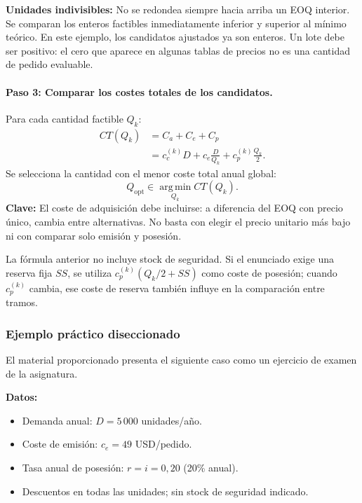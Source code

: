 \documentclass[11pt,a4paper]{article}
\begin{document}
\textbf{Unidades indivisibles:} No se redondea siempre hacia arriba un EOQ interior. Se comparan los enteros factibles inmediatamente inferior y superior al mínimo teórico. En este ejemplo, los candidatos ajustados ya son enteros. Un lote debe ser positivo: el cero que aparece en algunas tablas de precios no es una cantidad de pedido evaluable.

\paragraph{Paso 3: Comparar los costes totales de los candidatos.}
Para cada cantidad factible $Q_k$:
\begin{align*}
    CT(Q_k)
     & =C_a+C_e+C_p \\
     & =c_c^{(k)}D
    +c_e\frac{D}{Q_k}
    +c_p^{(k)}\frac{Q_k}{2}.
\end{align*}
Se selecciona la cantidad con el menor coste total anual global:
\[
    Q_{\mathrm{opt}}\in\operatorname*{arg\,min}_{Q_k}CT(Q_k).
\]
\textbf{Clave:} El coste de adquisición debe incluirse: a diferencia del EOQ con precio único, cambia entre alternativas. No basta con elegir el precio unitario más bajo ni con comparar solo emisión y posesión.

La fórmula anterior no incluye stock de seguridad. Si el enunciado exige una reserva fija $SS$, se utiliza $c_p^{(k)}(Q_k/2+SS)$ como coste de posesión; cuando $c_p^{(k)}$ cambia, ese coste de reserva también influye en la comparación entre tramos.

\subsubsection{Ejemplo práctico diseccionado}
El material proporcionado presenta el siguiente caso como un ejercicio de examen de la asignatura.

\textbf{Datos:}
\begin{itemize}
    \item Demanda anual: $D=5\,000$ unidades/año.
    \item Coste de emisión: $c_e=49$ USD/pedido.
    \item Tasa anual de posesión: $r=i=0{,}20$ (20\% anual).
    \item Descuentos en todas las unidades; sin stock de seguridad indicado.
\end{itemize}
\end{document}

